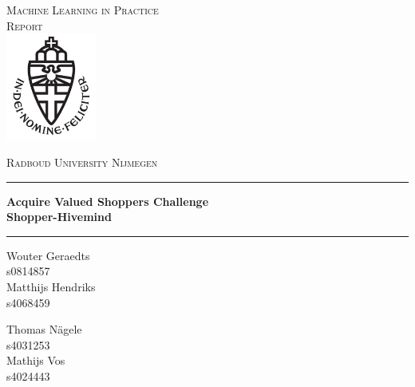 \documentclass[a4paper]{jmlr}
\begin{document}
\begin{titlepage}
	\begin{center}
	\textsc{\LARGE Machine Learning in Practice\\}
	\textsc{\Large Report}\\[1.5cm]
	\includegraphics[height=100pt]{logo}
   
	\vspace{0.4cm}
	\textsc{\Large Radboud University Nijmegen}\\[.5cm]
	\hrule
	\vspace{0.4cm}
	\textbf{\huge Acquire Valued Shoppers Challenge}\\[0.4cm]
	\textbf{\huge Shopper-Hivemind}\\[0.4cm]
	\hrule
	\vspace{1cm}
	\begin{minipage}[t]{0.45\textwidth}
	\begin{flushleft} \large
	Wouter Geraedts\\
	s0814857\\[0.7cm]
	Matthijs Hendriks\\
	s4068459\\[0.7cm]
	\end{flushleft}
	\end{minipage}
	\begin{minipage}[t]{0.45\textwidth}
	\begin{flushright} \large
	Thomas N\"agele\\
	s4031253\\[0.7cm]
	Mathijs Vos\\
	s4024443\\[0.7cm]
	\end{flushright}
	\end{minipage}
	\vspace{.7cm}
	

\end{center}
\end{titlepage}
\end{document}

